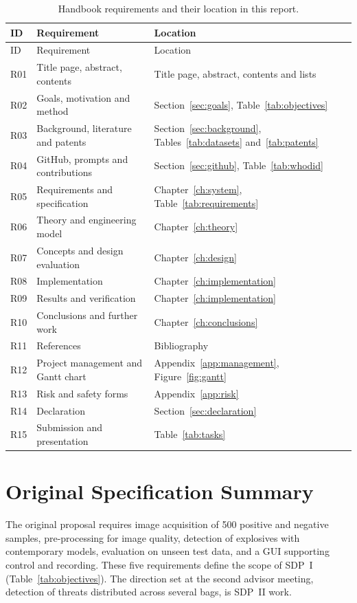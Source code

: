 \begingroup\tablesetup
\begin{longtable}{@{}lL{0.36\textwidth}L{0.5\textwidth}@{}}
\caption{Handbook requirements and their location in this report.}\label{tab:coverage}\\
\toprule ID & Requirement & Location \\\midrule\endfirsthead
\toprule ID & Requirement & Location \\\midrule\endhead
R01 & Title page, abstract, contents & Title page, abstract, contents and lists \\
R02 & Goals, motivation and method & Section~\ref{sec:goals}, Table~\ref{tab:objectives} \\
R03 & Background, literature and patents & Section~\ref{sec:background}, Tables~\ref{tab:datasets}
and~\ref{tab:patents} \\
R04 & GitHub, prompts and contributions & Section~\ref{sec:github}, Table~\ref{tab:whodid} \\
R05 & Requirements and specification & Chapter~\ref{ch:system}, Table~\ref{tab:requirements} \\
R06 & Theory and engineering model & Chapter~\ref{ch:theory} \\
R07 & Concepts and design evaluation & Chapter~\ref{ch:design} \\
R08 & Implementation & Chapter~\ref{ch:implementation} \\
R09 & Results and verification & Chapter~\ref{ch:implementation} \\
R10 & Conclusions and further work & Chapter~\ref{ch:conclusions} \\
R11 & References & Bibliography \\
R12 & Project management and Gantt chart & Appendix~\ref{app:management}, Figure~\ref{fig:gantt} \\
R13 & Risk and safety forms & Appendix~\ref{app:risk} \\
R14 & Declaration & Section~\ref{sec:declaration} \\
R15 & Submission and presentation & Table~\ref{tab:tasks} \\
\bottomrule
\end{longtable}
\endgroup

\section{Original Specification Summary}
The original proposal requires image acquisition of 500 positive and negative
samples, pre-processing for image quality, detection of explosives with
contemporary models, evaluation on unseen test data, and a GUI supporting control
and recording. These five requirements define the scope of SDP~I
(Table~\ref{tab:objectives}). The direction set at the second advisor meeting,
detection of threats distributed across several bags, is SDP~II work.

